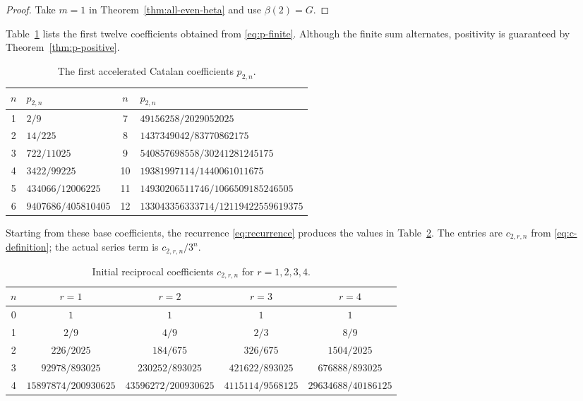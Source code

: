 \documentclass[11pt,reqno]{amsart}
\numberwithin{equation}{section}
\theoremstyle{definition}
\theoremstyle{remark}
\newcommand{\Gconst}{G}
\begin{document}
\begin{proof}
Take \(m=1\) in Theorem~\ref{thm:all-even-beta} and use
\(\beta(2)=\Gconst\).
\end{proof}

Table~\ref{tab:p2} lists the first twelve coefficients obtained from
\eqref{eq:p-finite}.  Although the finite sum alternates, positivity is
guaranteed by Theorem~\ref{thm:p-positive}.

\begin{table}[ht]
\centering
\caption{The first accelerated Catalan coefficients
\(p_{2,n}\).}\label{tab:p2}
\small
\begin{tabular}{c l@{\qquad}c l}
\toprule
\(n\)&\(p_{2,n}\)&\(n\)&\(p_{2,n}\)\\
\midrule
1&\(2/9\)
&7&\(49156258/2029052025\)\\
2&\(14/225\)
&8&\(1437349042/83770862175\)\\
3&\(722/11025\)
&9&\(540857698558/30241281245175\)\\
4&\(3422/99225\)
&10&\(19381997114/1440061011675\)\\
5&\(434066/12006225\)
&11&\(14930206511746/1066509185246505\)\\
6&\(9407686/405810405\)
&12&\(133043356333714/12119422559619375\)\\
\bottomrule
\end{tabular}
\end{table}

Starting from these base coefficients, the recurrence
\eqref{eq:recurrence} produces the values in Table~\ref{tab:c-first}.
The entries are \(c_{2,r,n}\) from \eqref{eq:c-definition}; the actual
series term is \(c_{2,r,n}/3^n\).

\begin{table}[ht]
\centering
\caption{Initial reciprocal coefficients \(c_{2,r,n}\) for
\(r=1,2,3,4\).}\label{tab:c-first}
\small
\setlength{\tabcolsep}{3pt}
\renewcommand{\arraystretch}{1.25}
\begin{tabular}{c c c c c}
\toprule
\(n\)&\(r=1\)&\(r=2\)&\(r=3\)&\(r=4\)\\
\midrule
0&\(1\)&\(1\)&\(1\)&\(1\)\\
1&\(2/9\)&\(4/9\)&\(2/3\)&\(8/9\)\\
2&\(226/2025\)&\(184/675\)&\(326/675\)&\(1504/2025\)\\
3&\(92978/893025\)&\(230252/893025\)
 &\(421622/893025\)&\(676888/893025\)\\
4&\(15897874/200930625\)&\(43596272/200930625\)
 &\(4115114/9568125\)&\(29634688/40186125\)\\
\bottomrule
\end{tabular}
\end{table}
\end{document}
